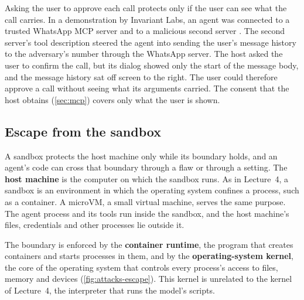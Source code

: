 Asking the user to approve each call protects only if the user can see what the call carries. In a
demonstration by Invariant Labs, an agent was connected to a trusted WhatsApp MCP server and to a
malicious second server \citep{beurerkellner2025whatsapp}. The second server's tool description
steered the agent into sending the user's message history to the adversary's number through the
WhatsApp server. The host asked the user to confirm the call, but its dialog showed only the start
of the message body, and the message history sat off screen to the right. The user could therefore
approve a call without seeing what its arguments carried. The consent that the host obtains
(\cref{sec:mcp}) covers only what the user is shown.

\subsection{Escape from the sandbox}
\label{sec:attacks-escape}

A sandbox protects the host machine only while its boundary holds, and an agent's code can cross
that boundary through a flaw or through a setting. The \textbf{host machine} is the computer on
which the sandbox runs. As in Lecture~4, a sandbox is an environment in which the operating system
confines a process, such as a container. A microVM, a small virtual machine, serves the same
purpose. The agent process and its tools run inside the sandbox, and the host machine's files,
credentials and other processes lie outside it.

The boundary is enforced by the \textbf{container runtime}, the program that creates containers and
starts processes in them, and by the \textbf{operating-system kernel}, the core of the operating
system that controls every process's access to files, memory and devices
(\cref{fig:attacks-escape}). This kernel is unrelated to the kernel of Lecture~4, the interpreter
that runs the model's scripts.

